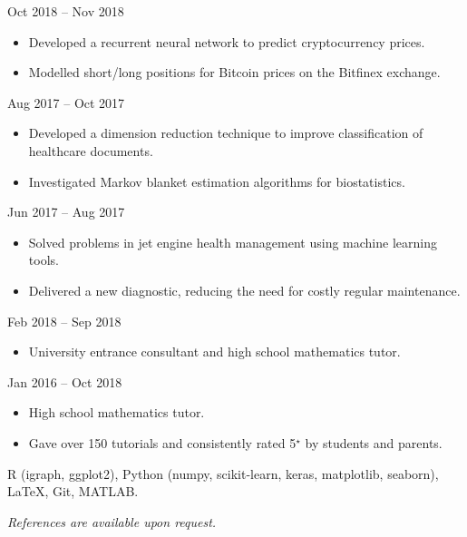 \documentclass[
  date,
  number,
]{wgu-cv}
\begin{document}

{}
{Oct 2018 -- Nov 2018}

\begin{itemize}
	\item Developed a recurrent neural network to predict cryptocurrency prices.
	\item Modelled short/long positions for Bitcoin prices on the Bitfinex exchange.
\end{itemize}


{}
{Aug 2017 -- Oct 2017}

\begin{itemize}
	\item Developed a dimension reduction technique to
    improve classification of healthcare documents.
	\item Investigated Markov blanket estimation algorithms for biostatistics.
\end{itemize}


{}
{Jun 2017 -- Aug 2017}

\begin{itemize}
	\item Solved problems in jet engine health management using machine learning tools.
	\item Delivered a new diagnostic, reducing the need for costly regular maintenance.
\end{itemize}



{}
{Feb 2018 -- Sep 2018}

\begin{itemize}
	\item University entrance consultant and high school mathematics tutor.
\end{itemize}


{}
{Jan 2016 -- Oct 2018}

\begin{itemize}
	\item High school mathematics tutor.
	\item Gave over 150 tutorials and consistently rated 5$^\star$ by students and parents.
\end{itemize}



R (igraph, ggplot2),
Python (numpy, scikit-learn, keras, matplotlib, seaborn),
LaTeX,
Git,
MATLAB.



\emph{References are available upon request.}



\nobibliography*
\end{document}
